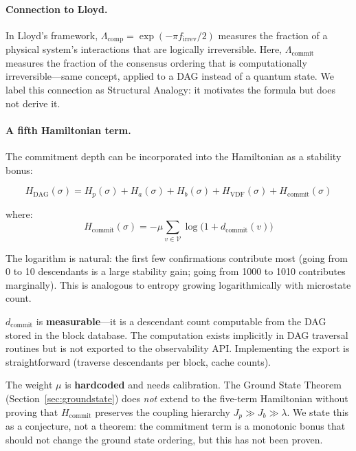 \documentclass[11pt,a4paper]{article}
\begin{document}
\paragraph{Connection to Lloyd.} In Lloyd's framework, $\Lambda_{\text{comp}} = \exp(-\pi f_{\text{irrev}} / 2)$ measures the fraction of a physical system's interactions that are logically irreversible. Here, $\Lambda_{\text{commit}}$ measures the fraction of the consensus ordering that is computationally irreversible---same concept, applied to a DAG instead of a quantum state. We label this connection as \textcolor{theoretical}{Structural Analogy}: it motivates the formula but does not derive it.

\paragraph{A fifth Hamiltonian term.} The commitment depth can be incorporated into the Hamiltonian as a stability bonus:

\begin{equation}
\boxed{H_{\text{DAG}}(\sigma) = H_p(\sigma) + H_a(\sigma) + H_b(\sigma) + H_{\text{VDF}}(\sigma) + H_{\text{commit}}(\sigma)}
\label{eq:hamiltonian5}
\end{equation}

where:
\begin{equation}
H_{\text{commit}}(\sigma) = -\mu \sum_{v \in \mathcal{V}} \log\bigl(1 + d_{\text{commit}}(v)\bigr)
\end{equation}

The logarithm is natural: the first few confirmations contribute most (going from 0 to 10 descendants is a large stability gain; going from 1000 to 1010 contributes marginally). This is analogous to entropy growing logarithmically with microstate count.

\begin{honesty}
$d_{\text{commit}}$ is \textbf{measurable}---it is a descendant count computable from the DAG stored in the block database. The computation exists implicitly in DAG traversal routines but is not exported to the observability API. Implementing the export is straightforward (traverse descendants per block, cache counts).

The weight $\mu$ is \textbf{hardcoded} and needs calibration. The Ground State Theorem (Section~\ref{sec:groundstate}) does \emph{not} extend to the five-term Hamiltonian without proving that $H_{\text{commit}}$ preserves the coupling hierarchy $J_p \gg J_b \gg \lambda$. We state this as a conjecture, not a theorem: the commitment term is a monotonic bonus that should not change the ground state ordering, but this has not been proven.
\end{honesty}
\end{document}
